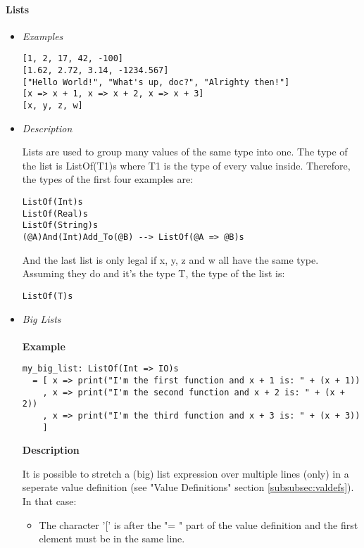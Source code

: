 \documentclass{article}
\begin{document}
\paragraph{Lists}

\begin{itemize}

\item \textit{Examples}
\begin{verbatim}
[1, 2, 17, 42, -100]
[1.62, 2.72, 3.14, -1234.567]
["Hello World!", "What's up, doc?", "Alrighty then!"]
[x => x + 1, x => x + 2, x => x + 3]
[x, y, z, w]
\end{verbatim}

\item \textit{Description}

Lists are used to group many values of the same type into one. 
The type of the list is ListOf(T1)s where T1 is the type of every value inside.
Therefore, the types of the first four examples are:
\begin{verbatim}
ListOf(Int)s
ListOf(Real)s
ListOf(String)s
(@A)And(Int)Add_To(@B) --> ListOf(@A => @B)s
\end{verbatim}
And the last list is only legal if x, y, z and w all have the same type. Assuming 
they do and it's the type T, the type of the list is: 
\begin{verbatim}
ListOf(T)s
\end{verbatim}

\item \textit{Big Lists}
  \\\\
  \textbf{Example}

  \begin{verbatim}
my_big_list: ListOf(Int => IO)s
  = [ x => print("I'm the first function and x + 1 is: " + (x + 1))
    , x => print("I'm the second function and x + 2 is: " + (x + 2))
    , x => print("I'm the third function and x + 3 is: " + (x + 3))
    ]
  \end{verbatim}

  \textbf{Description} 

  It is possible to stretch a (big) list expression over multiple lines (only) in
  a seperate value definition (see "Value Definitions" section
  \ref{subsubsec:valdefs}).  In that case:
  \begin{itemize}
  \item
  The character '[' is after the "= " part of the value definition
  and the first element must be in the same line.


\end{itemize}
\end{itemize}
\end{document}
